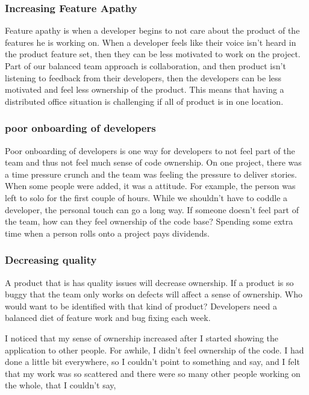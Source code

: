 \subsubsection{Increasing Feature Apathy}
Feature apathy is when a developer begins to not care about the product of the features he is working on. When a developer feels like their voice isn't heard in the product feature set, then they can be less motivated to work on the project. Part of our balanced team approach is collaboration, and then product isn't listening to feedback from their developers, then the developers can be less motivated and feel less ownership of the product. This means that having a distributed office situation is challenging if all of product is in one location. 

\subsubsection{poor onboarding of developers}
Poor onboarding of developers is one way for developers to not feel part of the team and thus not feel much sense of code ownership. On one project, there was a time pressure crunch and the team was feeling the pressure to deliver stories. When some people were added, it was a  attitude. For example, the person was left to solo for the first couple of hours. While we shouldn't have to coddle a developer, the personal touch can go a long way. If someone doesn't feel part of the team, how can they feel ownership of the code base?  Spending some extra time when a person rolls onto a project pays dividends. 

\subsubsection{Decreasing quality}
A product that is has quality issues will decrease ownership. If a product is so buggy that the team only works on defects will affect a sense of ownership. Who would want to be identified with that kind of product? Developers need a balanced diet of feature work and bug fixing each week.




I noticed that my sense of ownership increased after I started showing the application to other people. For awhile, I didn't feel ownership of the code. I had done a little bit everywhere, so I couldn't point to something and say,  and I felt that my work was so scattered and there were so many other people working on the whole, that I couldn't say, 

